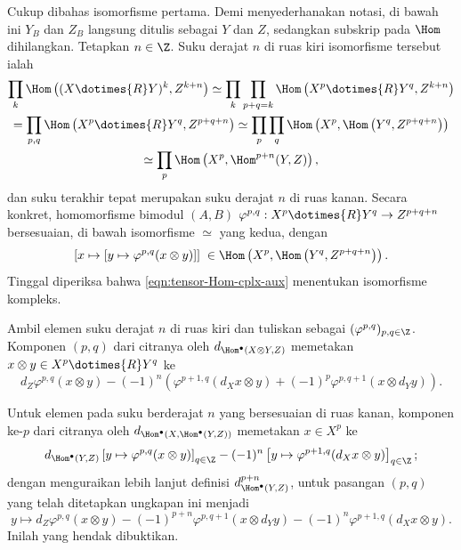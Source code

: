 \begin{bukti}
	Cukup dibahas isomorfisme pertama. Demi menyederhanakan notasi, di bawah
	ini $Y_B$ dan $Z_B$ langsung ditulis sebagai $Y$ dan $Z$, sedangkan subskrip
	pada $\Hom$ dihilangkan. Tetapkan $n\in\Z$. Suku derajat $n$ di ruas kiri
	isomorfisme tersebut ialah
	\begin{multline}\label{eqn:tensor-Hom-cplx-aux}
		\prod_k \Hom\left( (X \dotimes{R} Y)^k, Z^{k+n}\right) \simeq \prod_k \prod_{p+q=k} \Hom\left(X^p \dotimes{R} Y^q, Z^{k+n}\right) \\
		= \prod_{p, q} \Hom\left( X^p \dotimes{R} Y^q, Z^{p+q+n} \right) \simeq \prod_p \prod_q \Hom\left( X^p, \Hom\left(Y^q, Z^{p+q+n}\right) \right) \\
		\simeq \prod_p \Hom\left( X^p, \Hom^{p+n}(Y, Z) \right),
	\end{multline}
	dan suku terakhir tepat merupakan suku derajat $n$ di ruas kanan. Secara
	konkret, homomorfisme bimodul $(A,B)$
	$\varphi^{p,q}:X^p\dotimes{R}Y^q\to Z^{p+q+n}$ bersesuaian, di bawah
	isomorfisme $\simeq$ yang kedua, dengan
	\[ \left[ x \mapsto [y \mapsto \varphi^{p,q}(x \otimes y)] \right] \; \in \Hom\left( X^p, \Hom\left(Y^q, Z^{p+q+n}\right) \right). \]
	Tinggal diperiksa bahwa \eqref{eqn:tensor-Hom-cplx-aux} menentukan
	isomorfisme kompleks.

	Ambil elemen suku derajat $n$ di ruas kiri dan tuliskan sebagai
	$(\varphi^{p,q})_{p,q\in\Z}$. Komponen $(p,q)$ dari citranya oleh
	$d_{\Hom^\bullet(X\otimes Y,Z)}$ memetakan
	$x\otimes y\in X^p\dotimes{R}Y^q$ ke
	\[ d_Z \varphi^{p,q}(x \otimes y) - (-1)^n \left( \varphi^{p+1, q}(d_X x \otimes y) + (-1)^p \varphi^{p, q+1}(x \otimes d_Y y) \right). \]

	Untuk elemen pada suku berderajat $n$ yang bersesuaian di ruas kanan, komponen ke-$p$
	dari citranya oleh $d_{\Hom^\bullet(X,\Hom^\bullet(Y,Z))}$ memetakan
	$x\in X^p$ ke
	\[
		d_{\Hom^\bullet(Y, Z)}\left[ y \mapsto \varphi^{p,q}(x \otimes y) \right]_{q \in \Z} - (-1)^n \left[ y \mapsto \varphi^{p+1, q}(d_X x \otimes y) \right]_{q \in \Z};
	\]
	dengan menguraikan lebih lanjut definisi
	$d^{p+n}_{\Hom^\bullet(Y,Z)}$, untuk pasangan $(p,q)$ yang telah ditetapkan
	ungkapan ini menjadi
	\[ y \mapsto d_Z \varphi^{p,q}(x \otimes y) - (-1)^{p+n} \varphi^{p, q+1}(x \otimes d_Y y) - (-1)^n \varphi^{p+1, q}(d_X x \otimes y). \]
	Inilah yang hendak dibuktikan.
\end{bukti}

